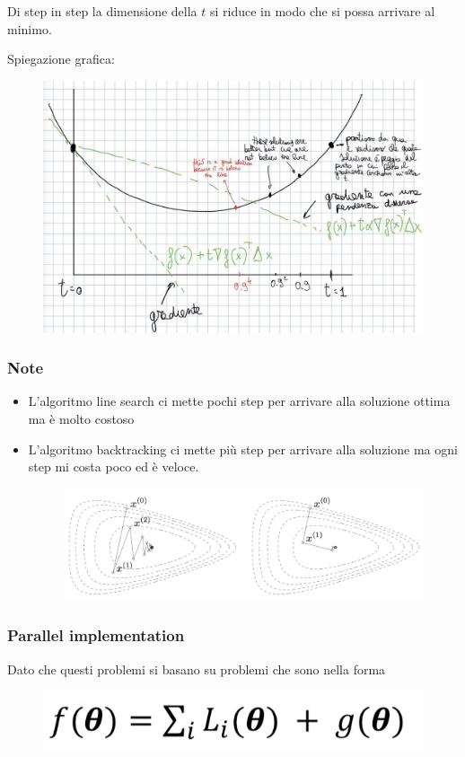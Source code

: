 \documentclass[14pt]{extreport}
\begin{document}
Di step in step la dimensione della $t$ si riduce in modo che si possa arrivare al minimo.

Spiegazione grafica:

\begin{figure}[H]
	\centering
	\includegraphics[width=0.7\linewidth]{244.jpeg}
\end{figure}

\subsubsection{Note}

\begin{itemize}
	\item L'algoritmo line search ci mette pochi step per arrivare alla soluzione ottima ma è molto costoso
	\item L'algoritmo backtracking ci mette più step per arrivare alla soluzione ma ogni step mi costa poco ed è veloce. \begin{figure}[H]
		      \centering
		      \includegraphics[width=0.7\linewidth]{243.jpeg}
	      \end{figure}
\end{itemize}

\subsubsection{Parallel implementation}

Dato che questi problemi si basano su problemi che sono nella forma

\begin{figure}[H]
	\centering
	\includegraphics[width=0.7\linewidth]{245.jpeg}
\end{figure}
\end{document}
